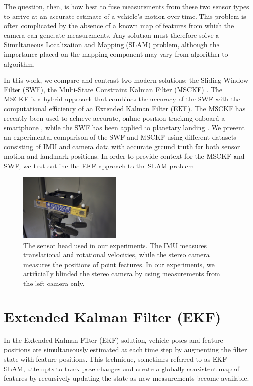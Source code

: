 \documentclass[letterpaper, 10 pt, conference]{ieeeconf}  %
\begin{document}
The question, then, is how best to fuse measurements from these two sensor types to arrive at an accurate estimate of a vehicle's motion over time.
This problem is often complicated by the absence of a known map of features from which the camera can generate measurements.
Any solution must therefore solve a Simultaneous Localization and Mapping (SLAM) problem, although the importance placed on the mapping component may vary from algorithm to algorithm.

In this work, we compare and contrast two modern solutions: the Sliding Window Filter (SWF), the Multi-State Constraint Kalman Filter (MSCKF) \cite{Mourikis:2006:TechReport,Mourikis:2007:ICRA}.
The MSCKF is a hybrid approach that combines the accuracy of the SWF with the computational efficiency of an Extended Kalman Filter (EKF).
The MSCKF has recently been used to achieve accurate, online position tracking onboard a smartphone \cite{Li:2013:ICRA}, while the SWF has been applied to planetary landing \cite{Sibley:2010:JFR}.
We present an experimental comparison of the SWF and MSCKF using different datasets consisting of IMU and camera data with accurate ground truth for both sensor motion and landmark positions.
In order to provide context for the MSCKF and SWF, we first outline the EKF approach to the SLAM problem.

\begin{figure}
    \centering
    \includegraphics[width=0.45\textwidth]{figs/sensorhead}
    \caption{The sensor head used in our experiments. The IMU measures translational and rotational velocities, while the stereo camera measures the positions of point features. In our experiments, we artificially blinded the stereo camera by using measurements from the left camera only.}
    \label{fig:sensorhead}
\end{figure}

\section{Extended Kalman Filter (EKF)} \label{sec:EKF}
In the Extended Kalman Filter (EKF) solution, vehicle poses and feature positions are simultaneously estimated at each time step by augmenting the filter state with feature positions.
This technique, sometimes referred to as EKF-SLAM, attempts to track pose changes and create a globally consistent map of features by recursively updating the state as new measurements become available.
\end{document}
